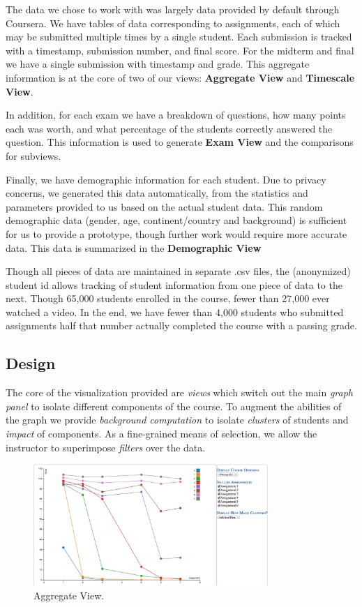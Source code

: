 The data we chose to work with was largely data provided by default through Coursera. We have tables of data corresponding to assignments, each of which may be submitted multiple times by a single student. Each submission is tracked with a  timestamp, submission number, and final score. For the midterm and final we have a single submission with timestamp and grade. This aggregate information is at the core of two of our views: {\bf Aggregate View} and  {\bf Timescale View}.

In addition, for each exam we have a breakdown of questions, how many points each was worth, and what percentage of the students correctly answered the question. This information is used to generate
{\bf Exam View} and the comparisons for subviews. 

Finally, we have demographic information for each student. Due to privacy concerns, we generated this data automatically, from the statistics and parameters provided to us based on the actual student data. This random demographic data (gender, age, continent/country and background) is sufficient for us to provide a prototype, though further work would require more accurate data. This data is summarized in the {\bf Demographic View} 

Though all pieces of data are maintained in separate .csv files, the (anonymized) student id allows tracking of student information from one piece of data to the next. Though 65,000 students enrolled in the course, fewer than 27,000 ever watched a video. In the end, we have fewer than 4,000 students who submitted assignments half that number actually completed the course with a passing grade. 

\subsection{Design}
The core of the visualization provided are \emph{views} which switch out the main \emph{graph panel} to isolate different components of the course. To augment the abilities of the graph we provide 
\emph{background computation} to isolate \emph{clusters} of students and \emph{impact} of components. As a fine-grained means of selection, we allow the instructor to superimpose \emph{filters} over the data.


\begin{figure}[htb]
 \centering
 \includegraphics[width=3.5in]{clusters.jpg}
 \caption{Aggregate View.}
 \label{fig:aggregate}	
\end{figure}

